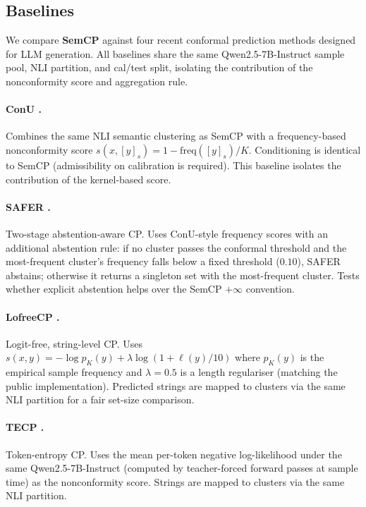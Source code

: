 \documentclass{article}
\begin{document}
\subsection{Baselines}

\label{sec:baselines}

We compare \textbf{SemCP} against four recent conformal prediction methods designed for LLM generation. All baselines share the same Qwen2.5-7B-Instruct sample pool, NLI partition, and cal/test split, isolating the contribution of the nonconformity score and aggregation rule.

\paragraph{ConU \citep{wang2024conu}.} Combines the same NLI semantic clustering as SemCP with a frequency-based nonconformity score $s(x, [y]_s) = 1 - \mathrm{freq}([y]_s) / K$. Conditioning is identical to SemCP (admissibility on calibration is required). This baseline isolates the contribution of the kernel-based score.

\paragraph{SAFER \citep{kumar2025safer}.} Two-stage abstention-aware CP. Uses ConU-style frequency scores with an additional abstention rule: if no cluster passes the conformal threshold and the most-frequent cluster's frequency falls below a fixed threshold ($0.10$), SAFER abstains; otherwise it returns a singleton set with the most-frequent cluster. Tests whether explicit abstention helps over the SemCP $+\infty$ convention.

\paragraph{LofreeCP \citep{su2024lofreecp}.} Logit-free, string-level CP. Uses $s(x, y) = -\log p_K(y) + \lambda \log(1 + \ell(y)/10)$ where $p_K(y)$ is the empirical sample frequency and $\lambda = 0.5$ is a length regulariser (matching the public implementation). Predicted strings are mapped to clusters via the same NLI partition for a fair set-size comparison.

\paragraph{TECP \citep{huang2025tecp}.} Token-entropy CP. Uses the mean per-token negative log-likelihood under the same Qwen2.5-7B-Instruct (computed by teacher-forced forward passes at sample time) as the nonconformity score. Strings are mapped to clusters via the same NLI partition.
\end{document}
